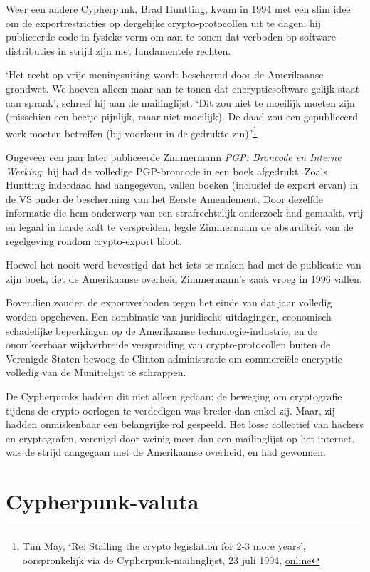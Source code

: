 \documentclass[
  a5paper,
  smalldemyvopaper,11pt,twoside,onecolumn,openright,extrafontsizes]{memoir}
\begin{document}
Weer een andere Cypherpunk, Brad Huntting, kwam in 1994 met een slim
idee om de exportrestricties op dergelijke crypto-protocollen uit te
dagen: hij publiceerde code in fysieke vorm om aan te tonen dat verboden
op software-distributies in strijd zijn met fundamentele rechten.

`Het recht op vrije meningsuiting wordt beschermd door de Amerikaanse
grondwet. We hoeven alleen maar aan te tonen dat encryptiesoftware
gelijk staat aan spraak', schreef hij aan de mailinglijst. `Dit zou niet
te moeilijk moeten zijn (misschien een beetje pijnlijk, maar niet
moeilijk). De daad zou een gepubliceerd werk moeten betreffen (bij
voorkeur in de gedrukte zin).'\footnote{Tim May, `Re: Stalling the
  crypto legislation for 2-3 more years', oorspronkelijk via de
  Cypherpunk-mailinglijst, 23 juli 1994,
  \href{https://cypherpunks.venona.com/date/1994/07/msg01245.html}{online}}

Ongeveer een jaar later publiceerde Zimmermann \emph{PGP: Broncode en
Interne Werking}: hij had de volledige PGP-broncode in een boek
afgedrukt. Zoals Huntting inderdaad had aangegeven, vallen boeken
(inclusief de export ervan) in de VS onder de bescherming van het Eerste
Amendement. Door dezelfde informatie die hem onderwerp van een
strafrechtelijk onderzoek had gemaakt, vrij en legaal in harde kaft te
verspreiden, legde Zimmermann de absurditeit van de regelgeving rondom
crypto-export bloot.

Hoewel het nooit werd bevestigd dat het iets te maken had met de
publicatie van zijn boek, liet de Amerikaanse overheid Zimmermann's zaak
vroeg in 1996 vallen.

Bovendien zouden de exportverboden tegen het einde van dat jaar volledig
worden opgeheven. Een combinatie van juridische uitdagingen, economisch
schadelijke beperkingen op de Amerikaanse technologie-industrie, en de
onomkeerbaar wijdverbreide verspreiding van crypto-protocollen buiten de
Verenigde Staten bewoog de Clinton administratie om commerciële
encryptie volledig van de Munitielijst te schrappen.

De Cypherpunks hadden dit niet alleen gedaan: de beweging om
cryptografie tijdens de crypto-oorlogen te verdedigen was breder dan
enkel zij. Maar, zij hadden onmiskenbaar een belangrijke rol gespeeld.
Het losse collectief van hackers en cryptografen, verenigd door weinig
meer dan een mailinglijst op het internet, was de strijd aangegaan met
de Amerikaanse overheid, en had gewonnen.

\chapter{Cypherpunk-valuta}\label{cypherpunk-valuta}
\end{document}
